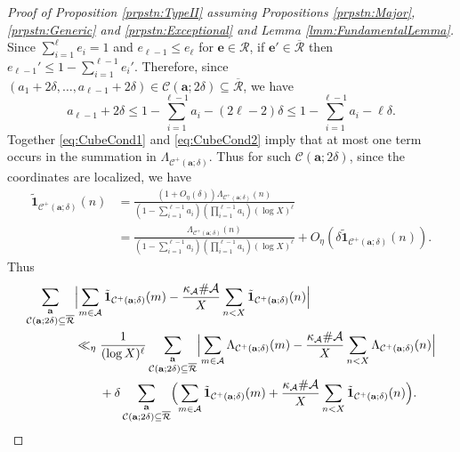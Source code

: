 \documentclass[10pt]{amsart}
\theoremstyle{plain}
\numberwithin{sblmm}{thrm}
\numberwithin{equation}{section}
\begin{document}
\begin{proof}[Proof of Proposition \ref{prpstn:TypeII} assuming Propositions \ref{prpstn:Major}, \ref{prpstn:Generic} and \ref{prpstn:Exceptional} and  Lemma \ref{lmm:FundamentalLemma}]
\begin{equation}
\end{equation}
Since $\sum_{i=1}^\ell e_i=1$ and $e_{\ell-1}\le e_\ell$ for $\mathbf{e}\in\mathcal{R}$, if $\mathbf{e}'\in\overline{\mathcal{R}}$ then $e_{\ell-1}'\le 1-\sum_{i=1}^{\ell-1}e_i'$. Therefore, since $(a_1+2\delta,\dots,a_{\ell-1}+2\delta)\in\mathcal{C}(\mathbf{a};2\delta)\subseteq\overline{\mathcal{R}}$, we have 
\begin{equation}
a_{\ell-1}+2\delta\le 1-\sum_{i=1}^{\ell-1}a_i-(2\ell-2)\delta\le 1-\sum_{i=1}^{\ell-1}a_i-\ell\delta.
\label{eq:CubeCond2}
\end{equation}
Together \eqref{eq:CubeCond1} and \eqref{eq:CubeCond2} imply that at most one term occurs in the summation in $\Lambda_{\mathcal{C}^+(\mathbf{a};\delta)}$. Thus for such $\mathcal{C}(\mathbf{a};2\delta)$, since the coordinates are localized, we have
\begin{align}
\tilde{\mathbf{1}}_{\mathcal{C}^+(\mathbf{a};\delta)}(n)&=\frac{(1+O_\eta(\delta))\Lambda_{\mathcal{C}^+(\mathbf{a};\delta)}(n)}{(1-\sum_{i=1}^{\ell-1}a_i)(\prod_{i=1}^{\ell-1} a_i)(\log{X})^\ell}\nonumber\\
&=\frac{\Lambda_{\mathcal{C}^+(\mathbf{a};\delta)}(n)}{(1-\sum_{i=1}^{\ell-1}a_i)(\prod_{i=1}^{\ell-1} a_i)(\log{X})^\ell}+O_\eta(\delta \tilde{\mathbf{1}}_{\mathcal{C}^+(\mathbf{a};\delta)}(n)).
\label{eq:LambdaApprox}
\end{align}
Thus
\begin{align}
 \sum_{\substack{\mathbf{a}\\ \mathcal{C}(\mathbf{a};2\delta)\subseteq\overline{\mathcal{R}}} }&\Bigl|\sum_{m\in\mathcal{A}}\tilde{\mathbf{1}}_{\mathcal{C}^+(\mathbf{a};\delta)}(m)-\frac{\kappa_\mathcal{A}\#\mathcal{A}}{X}\sum_{n< X}\tilde{\mathbf{1}}_{\mathcal{C}^+(\mathbf{a};\delta)}(n)\Bigr|\nonumber\\
&\ll_\eta \frac{1}{(\log{X})^\ell} \sum_{\substack{\mathbf{a}\\ \mathcal{C}(\mathbf{a};2\delta)\subseteq\overline{\mathcal{R}}} }\Bigl|\sum_{m\in\mathcal{A}}\Lambda_{\mathcal{C}^+(\mathbf{a};\delta)}(m)-\frac{\kappa_\mathcal{A}\#\mathcal{A}}{X}\sum_{n< X}\Lambda_{\mathcal{C}^+(\mathbf{a};\delta)}(n)\Bigr|\nonumber\\
&\qquad +\delta\sum_{\substack{\mathbf{a}\\ \mathcal{C}(\mathbf{a};2\delta)\subseteq\overline{\mathcal{R}}} }\Bigl(\sum_{m\in\mathcal{A}}\tilde{\mathbf{1}}_{\mathcal{C}^+(\mathbf{a};\delta)}(m)+\frac{\kappa_\mathcal{A}\#\mathcal{A}}{X}\sum_{n< X}\tilde{\mathbf{1}}_{\mathcal{C}^+(\mathbf{a};\delta)}(n)\Bigr).

\end{align}
\end{proof}
\end{document}
